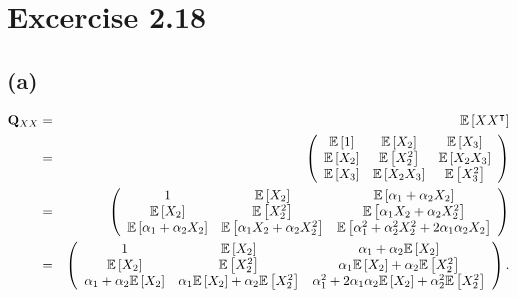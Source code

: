 \documentclass{article}
\begin{document}
\section{Excercise 2.18}

\subsection*{(a)}

\begin{eqnarray*}
\mathbf{Q}_{XX} &=&\mathbb{E}\left[ XX^{\intercal }\right] \\
&=&\left( 
\begin{array}{ccc}
\mathbb{E}\left[ 1\right] & \mathbb{E}\left[ X_{2}\right] & \mathbb{E}\left[
X_{3}\right] \\ 
\mathbb{E}\left[ X_{2}\right] & \mathbb{E}\left[ X_{2}^{2}\right] & \mathbb{E%
}\left[ X_{2}X_{3}\right] \\ 
\mathbb{E}\left[ X_{3}\right] & \mathbb{E}\left[ X_{2}X_{3}\right] & \mathbb{%
E}\left[ X_{3}^{2}\right]%
\end{array}%
\right) \\
&=&\left( 
\begin{array}{ccc}
1 & \mathbb{E}\left[ X_{2}\right] & \mathbb{E}\left[ \alpha _{1}+\alpha
_{2}X_{2}\right] \\ 
\mathbb{E}\left[ X_{2}\right] & \mathbb{E}\left[ X_{2}^{2}\right] & \mathbb{E%
}\left[ \alpha _{1}X_{2}+\alpha _{2}X_{2}^{2}\right] \\ 
\mathbb{E}\left[ \alpha _{1}+\alpha _{2}X_{2}\right] & \mathbb{E}\left[
\alpha _{1}X_{2}+\alpha _{2}X_{2}^{2}\right] & \mathbb{E}\left[ \alpha
_{1}^{2}+\alpha _{2}^{2}X_{2}^{2}+2\alpha _{1}\alpha _{2}X_{2}\right]%
\end{array}%
\right) \\
&=&\left( 
\begin{array}{ccc}
1 & \mathbb{E}\left[ X_{2}\right] & \alpha _{1}+\alpha _{2}\mathbb{E}\left[
X_{2}\right] \\ 
\mathbb{E}\left[ X_{2}\right] & \mathbb{E}\left[ X_{2}^{2}\right] & \alpha
_{1}\mathbb{E}\left[ X_{2}\right] +\alpha _{2}\mathbb{E}\left[ X_{2}^{2}%
\right] \\ 
\alpha _{1}+\alpha _{2}\mathbb{E}\left[ X_{2}\right] & \alpha _{1}\mathbb{E}%
\left[ X_{2}\right] +\alpha _{2}\mathbb{E}\left[ X_{2}^{2}\right] & \alpha
_{1}^{2}+2\alpha _{1}\alpha _{2}\mathbb{E}\left[ X_{2}\right] +\alpha
_{2}^{2}\mathbb{E}\left[ X_{2}^{2}\right]%
\end{array}%
\right) .
\end{eqnarray*}
\end{document}
